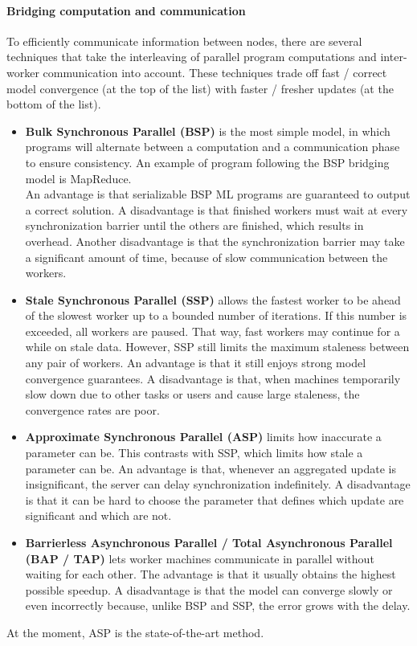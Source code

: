 \paragraph{Bridging computation and communication}
To efficiently communicate information between nodes, there are several techniques that take the interleaving of parallel program computations and inter-worker communication into account. These techniques trade off fast / correct model convergence (at the top of the list) with faster / fresher updates (at the bottom of the list).
\begin{itemize}
	\item \textbf{Bulk Synchronous Parallel (BSP)} is the most simple model, in which programs will alternate between a computation and a communication phase to ensure consistency\cite{Xing16}. An example of program following the BSP bridging model is MapReduce.\\
	An advantage is that serializable BSP ML programs are guaranteed to output a correct solution. A disadvantage is that finished workers must wait at every synchronization barrier until the others are finished, which results in overhead\cite{Chilimbi14}. Another disadvantage is that the synchronization barrier may take a significant amount of time, because of slow communication between the workers.
	\item \textbf{Stale Synchronous Parallel (SSP)} allows the fastest worker to be ahead of the slowest worker up to a bounded number of iterations. If this number is exceeded, all workers are paused. That way, fast workers may continue for a while on stale data. However, SSP still limits the maximum staleness between any pair of workers. An advantage is that it still enjoys strong model convergence guarantees. A disadvantage is that, when machines temporarily slow down due to other tasks or users and cause large staleness, the convergence rates are poor.
	\item \textbf{Approximate Synchronous Parallel (ASP)} limits how inaccurate a parameter can be. This contrasts with SSP, which limits how stale a parameter can be. An advantage is that, whenever an aggregated update is insignificant, the server can delay synchronization indefinitely. A disadvantage is that it can be hard to choose the parameter that defines which update are significant and which are not. \cite{Hsieh17}
	\item \textbf{Barrierless Asynchronous Parallel\cite{Han15} / Total Asynchronous Parallel\cite{Hsieh17} (BAP / TAP)} lets worker machines communicate in parallel without waiting for each other. The advantage is that it usually obtains the highest possible speedup. A disadvantage is that the model can converge slowly or even incorrectly because, unlike BSP and SSP, the error grows with the delay. \cite{Han15}
\end{itemize}
At the moment, ASP is the state-of-the-art method.


